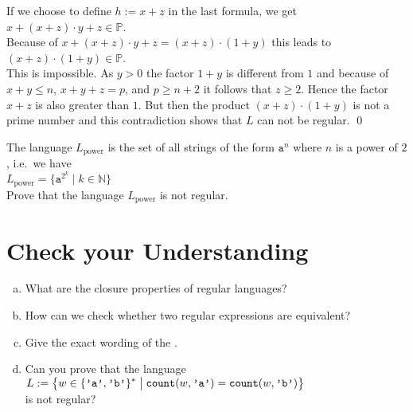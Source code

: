If we choose to define $h := x + z$ in the last formula, we get
\\[0.2cm]
\hspace*{1.3cm}
$x + (x + z)\cdot y + z \in \mathbb{P}$.
\\[0.2cm]
Because of $x + (x + z)\cdot y + z = (x + z) \cdot (1 + y)$ this leads to
\\[0.2cm]
\hspace*{1.3cm}
$(x + z) \cdot (1 + y) \in \mathbb{P}$.
\\[0.2cm]
This is impossible. As $y > 0$ the factor $1 + y$ is different from $1$
and because of $x + y \leq n$, $x + y + z = p$, and $p \geq n + 2$ it follows that
$z \geq 2$.  Hence the factor $x + z$ is also greater than $1$.  But then the product
$(x + z) \cdot (1 + y)$ is not a prime number and this contradiction shows that $L$ can not be regular.
\qed


\exerciseEng
The language $L_{\mathrm{power}}$ is the set of all strings of the form $\mathtt{a}^n$ where $n$ is a power of
$2$, i.e.~we have
\\[0.2cm]
\hspace*{1.3cm}
$L_{\mathrm{power}} = \bigl\{ \mathtt{a}^{2^k} \mid k \in \mathbb{N} \bigr\}$
\\[0.2cm]
Prove that the language $L_{\mathrm{power}}$ is not regular.
\eox

\section{Check your Understanding}
\begin{enumerate}[(a)]
\item What are the closure properties of regular languages?
\item How can we check whether two regular expressions are equivalent?
\item Give the exact wording of the .
\item Can you prove that the language
      \\[0.2cm]
      \hspace*{1.3cm}
      $\displaystyle L := \bigl\{ w \in \{\texttt{'a'}, \texttt{'b'}\}^* \bigm| \texttt{count}(w, \texttt{'a'})=\texttt{count}(w, \texttt{'b'}) \bigr\}$
      \\[0.2cm]
      is not regular?
\end{enumerate}

